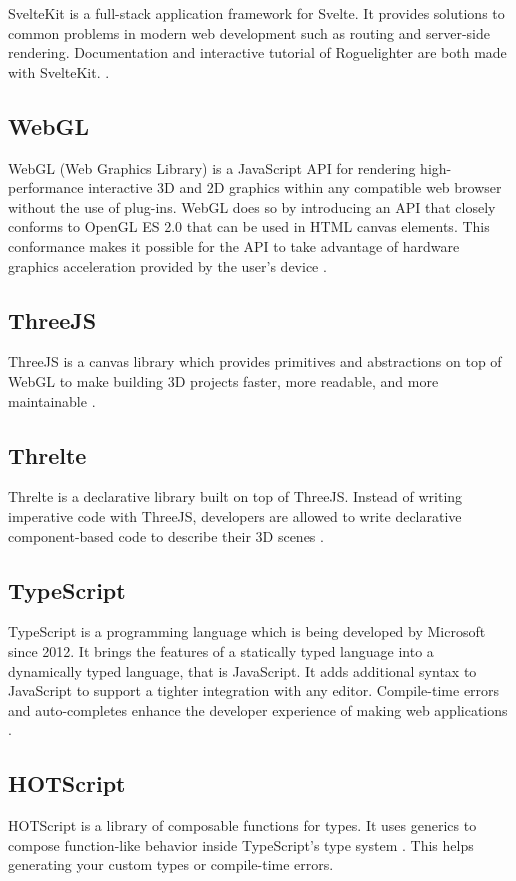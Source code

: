 \documentclass{article}
\begin{document}
SvelteKit is a full-stack application framework for Svelte. It provides solutions to common problems in modern web development such as routing and server-side rendering. Documentation and interactive tutorial of Roguelighter are both made with SvelteKit. \cite{sveltekit}.

\subsection{WebGL}
WebGL (Web Graphics Library) is a JavaScript API for rendering high-performance interactive 3D and 2D graphics within any compatible web browser without the use of plug-ins. WebGL does so by introducing an API that closely conforms to OpenGL ES 2.0 that can be used in HTML canvas elements. This conformance makes it possible for the API to take advantage of hardware graphics acceleration provided by the user's device \cite{webgl}. 

\subsection{ThreeJS}
ThreeJS is a canvas library which provides primitives and abstractions on top of WebGL to make building 3D projects faster, more readable, and more maintainable \cite{threejs}.

\subsection{Threlte}
Threlte is a declarative library built on top of ThreeJS. Instead of writing imperative code with ThreeJS, developers are allowed to write declarative component-based code to describe their 3D scenes \cite{threlte}.

\subsection{TypeScript}
TypeScript is a programming language which is being developed by Microsoft since 2012. It brings the features of a statically typed language into a dynamically typed language, that is JavaScript. It adds additional syntax to JavaScript to support a tighter integration with any editor. Compile-time errors and auto-completes enhance the developer experience of making web applications \cite{typescript}. 

\subsection{HOTScript}
HOTScript is a library of composable functions for types. It uses generics to compose function-like behavior inside TypeScript’s type system \cite{hotscript}. This helps generating your custom types or compile-time errors.\\
\end{document}
